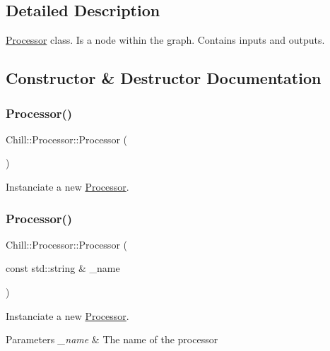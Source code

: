 \subsection{Detailed Description}
\mbox{\hyperlink{class_chill_1_1_processor}{Processor}} class. Is a node within the graph. Contains inputs and outputs. 

\subsection{Constructor \& Destructor Documentation}
\mbox{\label{class_chill_1_1_processor_ae4f5d1338dcae8154ea8339cb2524fd1}} 
\subsubsection{\texorpdfstring{Processor()}{Processor()}\hspace{0.1cm}{\footnotesize\ttfamily [1/4]}}
{\footnotesize\ttfamily Chill\+::\+Processor\+::\+Processor (\begin{DoxyParamCaption}{ }\end{DoxyParamCaption})\hspace{0.3cm}{\ttfamily [inline]}}

Instanciate a new \mbox{\hyperlink{class_chill_1_1_processor}{Processor}}. \mbox{\label{class_chill_1_1_processor_ac8ef42b4ab4e0c32265743691d4bb272}} 
\subsubsection{\texorpdfstring{Processor()}{Processor()}\hspace{0.1cm}{\footnotesize\ttfamily [2/4]}}
{\footnotesize\ttfamily Chill\+::\+Processor\+::\+Processor (\begin{DoxyParamCaption}\item[{const std\+::string \&}]{\+\_\+name }\end{DoxyParamCaption})\hspace{0.3cm}{\ttfamily [inline]}}

Instanciate a new \mbox{\hyperlink{class_chill_1_1_processor}{Processor}}. 
\begin{DoxyParams}{Parameters}
{\em \+\_\+name} & The name of the processor \\
\hline
\end{DoxyParams}
\mbox{\label{class_chill_1_1_processor_aed80279651d92dd2d3077120ba2c8491}} 
